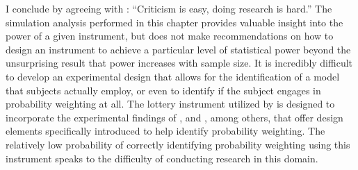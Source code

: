 \documentclass[../main.tex]{subfiles}
\begin{document}

I conclude by agreeing with \textcite[14]{Gelman2013}: \enquote{Criticism is easy, doing research is hard.}
The simulation analysis performed in this chapter provides valuable insight into the power of a given instrument, but does not make recommendations on how to design an instrument to achieve a particular level of statistical power beyond the unsurprising result that power increases with sample size.
It is incredibly difficult to develop an experimental design that allows for the identification of a model that subjects actually employ, or even to identify if the subject engages in probability weighting at all.
The lottery instrument utilized by \textcite[98-99]{Harrison2016} is designed to incorporate the experimental findings of \textcite{Camerer1989}, \textcite{Harless1992} and \textcite{Loomes1998}, among others, that offer design elements specifically introduced to help identify probability weighting.
The relatively low probability of correctly identifying probability weighting using this instrument speaks to the difficulty of conducting research in this domain.

\onlyinsubfile{
\newpage
\printbibliography[segment=4, heading=subbibliography]
}
\end{document}
